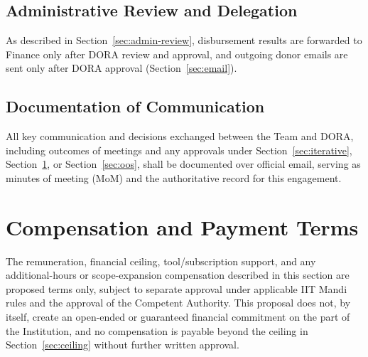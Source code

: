 \documentclass[11pt]{article}
\begin{document}
\subsection{Administrative Review and Delegation}
As described in Section~\ref{sec:admin-review}, disbursement results are forwarded to Finance only after DORA review and approval, and outgoing donor emails are sent only after DORA approval (Section~\ref{sec:email}).

\subsection{Documentation of Communication}
\label{sec:comm-doc}
All key communication and decisions exchanged between the Team and DORA, including outcomes of meetings and any approvals under Section~\ref{sec:iterative}, Section~\ref{sec:compensation}, or Section~\ref{sec:oos}, shall be documented over official email, serving as minutes of meeting (MoM) and the authoritative record for this engagement.

\section{Compensation and Payment Terms}
\label{sec:compensation}
The remuneration, financial ceiling, tool/subscription support, and any additional-hours or scope-expansion compensation described in this section are proposed terms only, subject to separate approval under applicable IIT Mandi rules and the approval of the Competent Authority. This proposal does not, by itself, create an open-ended or guaranteed financial commitment on the part of the Institution, and no compensation is payable beyond the ceiling in Section~\ref{sec:ceiling} without further written approval.
\end{document}
